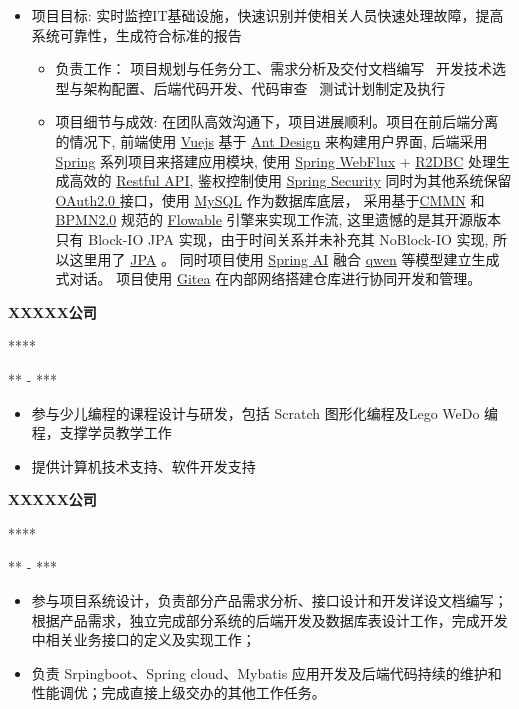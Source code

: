 \documentclass[11pt,a4paper]{article}
\newcommand{\company}[1]{%
    {\vspace{0.2em}\sffamily\textbf{\large#1}}%
}
\newcommand{\position}[2]{%
    \vspace{0.1em}  %
    \role{#1}\hfill\role{#2}%
    \vspace{0.2em}  %
}
\newcommand{\role}[1]{{\sffamily\color{graytext}\small#1}}
\newcommand{\daterange}[1]{\hfill{\sffamily\color{graytext}\small#1}}
\newcommand{\project}[1]{{\sffamily\textbf{\cjkit { \textit {\itshape#1}}}}}
\newcommand{\separator}{\textbullet~}  %
\begin{document}
\project{XXX系统}
\begin{itemize}
    \item 项目目标: 实时监控IT基础设施，快速识别并使相关人员快速处理故障，提高系统可靠性，生成符合标准的报告
        \begin{itemize}
            \item 负责工作： 项目规划与任务分工、需求分析及交付文档编写 \separator 开发技术选型与架构配置、后端代码开发、代码审查 \separator 测试计划制定及执行
            \item 项目细节与成效: 在团队高效沟通下，项目进展顺利。项目在前后端分离的情况下, 前端使用 \href{https://cn.vuejs.org/}{Vuejs} 基于 \href{https://ant.design/index-cn}{Ant Design} 来构建用户界面, 后端采用 \href{https://spring.io/}{Spring} 系列项目来搭建应用模块, 使用 \href{https://docs.spring.io/spring-framework/reference/web-reactive.html}{Spring WebFlux} + \href{https://spring.io/projects/spring-data-r2dbc}{R2DBC} 处理生成高效的 \href{https://www.ibm.com/cn-zh/topics/rest-apis}{Restful API}, 
            鉴权控制使用 \href{https://spring.io/projects/spring-security}{Spring Security} 同时为其他系统保留 \href{https://oauth.ac.cn/2/}{OAuth2.0 } 接口，使用 \href{https://www.mysql.com/cn/}{MySQL} 作为数据库底层，
            采用基于\href{https://www.omg.org/spec/CMMN}{CMMN} 和 \href{https://www.omg.org/spec/BPMN/2.0}{BPMN2.0} 规范的 \href{https://www.flowable.com/open-source/docs/}{Flowable} 引擎来实现工作流, 这里遗憾的是其开源版本只有 Block-IO JPA 实现，由于时间关系并未补充其 NoBlock-IO 实现, 所以这里用了 \href{https://spring.io/projects/spring-data-jpa}{JPA} 。
            同时项目使用 \href{https://spring.io/projects/spring-ai}{Spring AI} 融合 \href{https://qwen.readthedocs.io/zh-cn/latest/index.html}{qwen} 等模型建立生成式对话。
            项目使用 \href{https://about.gitea.com/}{Gitea} 在内部网络搭建仓库进行协同开发和管理。
        \end{itemize}
    
\end{itemize}

\company{XXXXX公司} 
\position{***}{***}
\daterange{*** - ***}
\begin{itemize}
    \item 参与少儿编程的课程设计与研发，包括 Scratch 图形化编程及Lego WeDo 编程，支撑学员教学工作
    \item 提供计算机技术支持、软件开发支持
\end{itemize}

\company{XXXXX公司} 
\position{***}{***}
\daterange{*** - ***}
\begin{itemize}
    \item 参与项目系统设计，负责部分产品需求分析、接口设计和开发详设文档编写；根据产品需求，独立完成部分系统的后端开发及数据库表设计工作，完成开发中相关业务接口的定义及实现工作；
    \item 负责 Srpingboot、Spring cloud、Mybatis 应用开发及后端代码持续的维护和性能调优；完成直接上级交办的其他工作任务。
\end{itemize}
\end{document}
